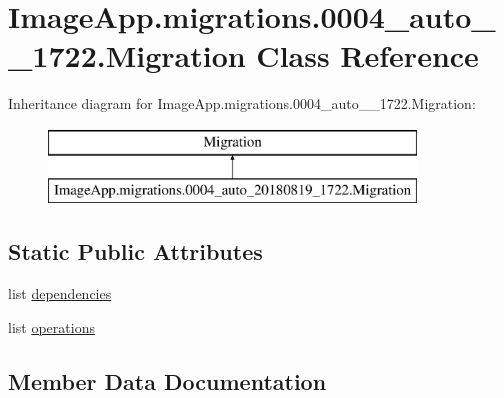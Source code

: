 \hypertarget{class_image_app_1_1migrations_1_10004__auto__20180819__1722_1_1_migration}{}\section{Image\+App.\+migrations.0004\+\_\+auto\+\_\+\_\+1722.Migration Class Reference}
\label{class_image_app_1_1migrations_1_10004__auto__20180819__1722_1_1_migration}
Inheritance diagram for Image\+App.\+migrations.0004\+\_\+auto\+\_\+\_\+1722.Migration\+:\begin{figure}[H]
\begin{center}
\leavevmode
\includegraphics[height=2.000000cm]{class_image_app_1_1migrations_1_10004__auto__20180819__1722_1_1_migration}
\end{center}
\end{figure}
\subsection*{Static Public Attributes}
\begin{DoxyCompactItemize}
\item 
list \mbox{\hyperlink{class_image_app_1_1migrations_1_10004__auto__20180819__1722_1_1_migration_ac162d538fef083d35dca6ff268b2dfb0}{dependencies}}
\item 
list \mbox{\hyperlink{class_image_app_1_1migrations_1_10004__auto__20180819__1722_1_1_migration_ab2af20850457c5864ba5ea409e91d9e1}{operations}}
\end{DoxyCompactItemize}


\subsection{Member Data Documentation}
\mbox{\label{class_image_app_1_1migrations_1_10004__auto__20180819__1722_1_1_migration_ac162d538fef083d35dca6ff268b2dfb0}} 
